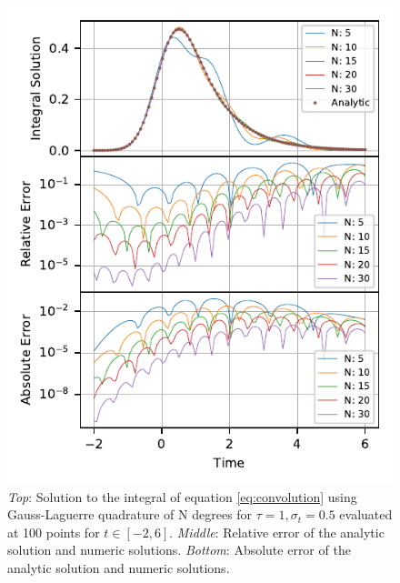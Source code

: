 \begin{figure}
    \centering
    \includegraphics{CodeAndFigures/GaussLaguerreQuadrature.pdf}
    \caption{\emph{Top}: Solution to the integral of equation \ref{eq:convolution} using Gauss-Laguerre quadrature of N degrees for $\tau=1,\sigma_t=0.5$ evaluated at 100 points for $t\in[-2,6]$. \emph{Middle}: Relative error of the analytic solution and numeric solutions. \emph{Bottom}: Absolute error of the analytic solution and numeric solutions.}
    \label{fig:GaussLaguerrePlot}
\end{figure}




